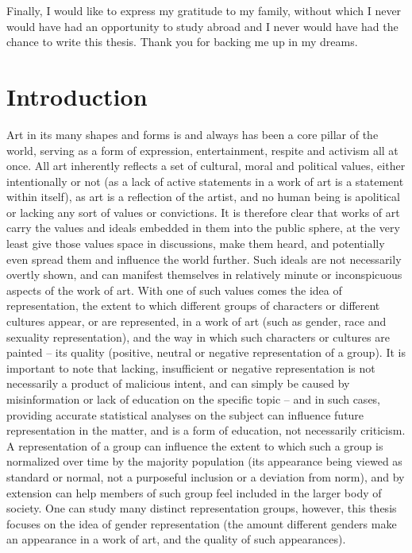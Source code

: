 \documentclass[a4paper, 11pt]{article}
\begin{document}
Finally, I would like to express my gratitude to my family, without which I never would have had an opportunity to study abroad and I never would have had the chance to write this thesis. Thank you for backing me up in my dreams.

\newpage
\tableofcontents
\listoftables
\listoffigures
\newpage


\section{Introduction}
Art in its many shapes and forms is and always has been a core pillar of the world, serving as a form of expression, entertainment, respite and activism all at once. All art inherently reflects a set of cultural, moral and political values, either intentionally or not (as a lack of active statements in a work of art is a statement within itself), as art is a reflection of the artist, and no human being is apolitical or lacking any sort of values or convictions. It is therefore clear that works of art carry the values and ideals embedded in them into the public sphere, at the very least give those values space in discussions, make them heard, and potentially even spread them and influence the world further. Such ideals are not necessarily overtly shown, and can manifest themselves in relatively minute or inconspicuous aspects of the work of art. With one of such values comes the idea of representation, the extent to which different groups of characters or different cultures appear, or are represented, in a work of art (such as gender, race and sexuality representation), and the way in which such characters or cultures are painted -- its quality (positive, neutral or negative representation of a group). It is important to note that lacking, insufficient or negative representation is not necessarily a product of malicious intent, and can simply be caused by misinformation or lack of education on the specific topic -- and in such cases, providing accurate statistical analyses on the subject can influence future representation in the matter, and is a form of education, not necessarily criticism. A representation of a group can influence the extent to which such a group is normalized over time by the majority population (its appearance being viewed as standard or normal, not a purposeful inclusion or a deviation from norm), and by extension can help members of such group feel included in the larger body of society. One can study many distinct representation groups, however, this thesis focuses on the idea of gender representation (the amount different genders make an appearance in a work of art, and the quality of such appearances).
\end{document}
